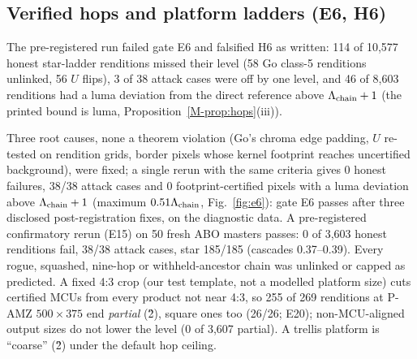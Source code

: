 \documentclass[10pt]{article}
\newcommand{\mainref}[1]{\ref{M-#1}}
\begin{document}
\subsection{Verified hops and platform ladders (E6, H6)}
The pre-registered run failed gate E6 and falsified H6 as written: 114 of 10,577 honest star-ladder renditions
missed their level (58 Go class-5 renditions unlinked, 56 $U$ flips), 3 of 38 attack cases were off by one level, and
46 of 8,603 renditions had a luma deviation from the direct reference above $\Lambda_{\mathrm{chain}}+1$ (the printed bound is luma, Proposition~\mainref{prop:hops}(iii)).

Three root causes, none a theorem violation (Go's chroma edge padding, $U$ re-tested on rendition grids, border
pixels whose kernel footprint reaches uncertified background), were fixed; a single rerun with the same criteria gives 0 honest failures, 38/38 attack cases and 0
footprint-certified pixels with a luma deviation above $\Lambda_{\mathrm{chain}}+1$ (maximum $0.51\Lambda_{\mathrm{chain}}$,
Fig.~\ref{fig:e6}): gate E6 passes after three disclosed post-registration fixes, on the diagnostic
data. A pre-registered confirmatory rerun (E15) on 50 fresh ABO masters passes: 0 of 3,603 honest
renditions fail, 38/38 attack cases,  star 185/185 (cascades 0.37--0.39).
Every rogue, squashed, nine-hop or withheld-ancestor chain was unlinked or capped as predicted. A fixed 4:3 crop (our test template, not a modelled platform size) cuts certified MCUs from every
product not near 4:3, so 255 of 269 renditions at P-AMZ $500\times375$ end \emph{partial} (\G{2}), square ones too
(26/26; E20); non-MCU-aligned output sizes do not lower the level (0 of 3,607 partial). A trellis platform is ``coarse'' (\G{2}) under the
default hop ceiling.
\end{document}
